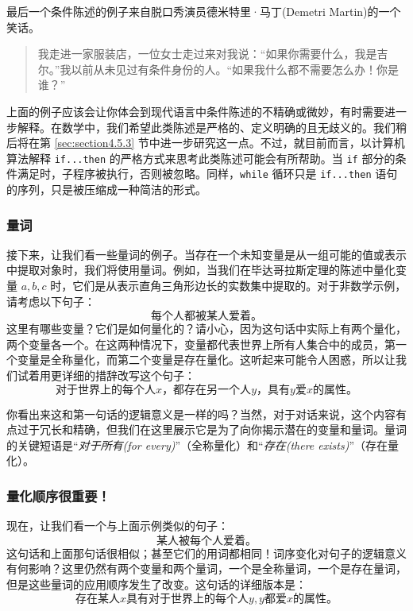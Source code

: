 最后一个条件陈述的例子来自脱口秀演员德米特里·马丁(Demetri Martin)的一个笑话。

\begin{quote}
    我走进一家服装店，一位女士走过来对我说：“如果你需要什么，我是吉尔。”我以前从未见过有条件身份的人。“如果我什么都不需要怎么办！你是谁？”
\end{quote}

上面的例子应该会让你体会到现代语言中条件陈述的不精确或微妙，有时需要进一步解释。在数学中，我们希望此类陈述是严格的、定义明确的且无歧义的。我们稍后将在第 \ref{sec:section4.5.3} 节中进一步研究这一点。不过，就目前而言，以计算机算法解释 \verb|if...then| 的严格方式来思考此类陈述可能会有所帮助。当 \verb|if| 部分的条件满足时，子程序被执行，否则被忽略。同样，\verb|while| 循环只是 \verb|if...then| 语句的序列，只是被压缩成一种简洁的形式。

\subsubsection*{量词}

接下来，让我们看一些量词的例子。当存在一个未知变量是从一组可能的值或表示中提取对象时，我们将使用量词。例如，当我们在毕达哥拉斯定理的陈述中量化变量 $a,b,c$ 时，它们是从表示直角三角形边长的实数集中提取的。对于非数学示例，请考虑以下句子：
\[\text{每个人都被某人爱着。}\]
这里有哪些变量？它们是如何量化的？请小心，因为这句话中实际上有两个量化，两个变量各一个。在这两种情况下，变量都代表世界上所有人集合中的成员，第一个变量是全称量化，而第二个变量是存在量化。这听起来可能令人困惑，所以让我们试着用更详细的措辞改写这个句子：
\[\text{对于世界上的每个人} x\text{，都存在另一个人} y \text{，具有} y \text{爱} x \text{的属性。}\]

你看出来这和第一句话的逻辑意义是一样的吗？当然，对于对话来说，这个内容有点过于冗长和精确，但我们在这里展示它是为了向你揭示潜在的变量和量词。量词的关键短语是“\textit{对于所有(for every)}”（全称量化）和“\textit{存在(there exists)}”（存在量化）。

\subsubsection*{量化顺序很重要！}

现在，让我们看一个与上面示例类似的句子：
\[\text{某人被每个人爱着。}\]
这句话和上面那句话很相似；甚至它们的用词都相同！词序变化对句子的逻辑意义有何影响？这里仍然有两个变量和两个量词，一个是全称量词，一个是存在量词，但是这些量词的应用顺序发生了改变。这句话的详细版本是：
\[\text{存在某人} x \text{具有对于世界上的每个人} y, y \text{都爱} x \text{的属性。}\]

